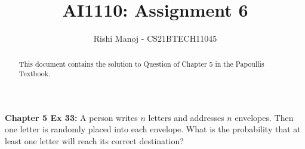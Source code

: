 \documentclass[journal,12pt,twocolumn]{IEEEtran}
\begin{document}
	
	
	\providecommand{\mbf}{\mathbf}
	\providecommand{\pr}[1]{\ensuremath{\Pr\left(#1\right)}}
	\providecommand{\qfunc}[1]{\ensuremath{Q\left(#1\right)}}
	\providecommand{\sbrak}[1]{\ensuremath{{}\left[#1\right]}}
	\providecommand{\lsbrak}[1]{\ensuremath{{}\left[#1\right.}}
	\providecommand{\rsbrak}[1]{\ensuremath{{}\left.#1\right]}}
	\providecommand{\brak}[1]{\ensuremath{\left(#1\right)}}
	\providecommand{\lbrak}[1]{\ensuremath{\left(#1\right.}}
	\providecommand{\rbrak}[1]{\ensuremath{\left.#1\right)}}
	\providecommand{\cbrak}[1]{\ensuremath{\left\{#1\right\}}}
	\providecommand{\lcbrak}[1]{\ensuremath{\left\{#1\right.}}
	\providecommand{\rcbrak}[1]{\ensuremath{\left.#1\right\}}}
	\providecommand{\dec}[2]{\ensuremath{\overset{#1}{\underset{#2}{\gtrless}}}}
	\newcommand{\myvec}[1]{\ensuremath{\begin{pmatrix}#1\end{pmatrix}}}
	\newcommand{\mydet}[1]{\ensuremath{\begin{vmatrix}#1\end{vmatrix}}}
	\newcommand*{\permcomb}[4][0mu]{{{}^{#3}\mkern#1#2_{#4}}}
	\newcommand*{\perm}[1][-3mu]{\permcomb[#1]{P}}
	\newcommand*{\comb}[1][-1mu]{\permcomb[#1]{C}}
		\title{
				AI1110: Assignment 6
		}
		\author{
			Rishi Manoj - CS21BTECH11045
		}
			
	\maketitle
	\begin{abstract}
		This document contains the solution to Question of Chapter 5 in the Papoullis Textbook.
	\end{abstract}
	
	\textbf{Chapter 5 Ex 33:}
	A person writes $n$ letters and addresses $n$ envelopes. Then one letter is randomly placed into each envelope. What is the probability that at least one letter will reach its correct destination? 
	
\end{document}

